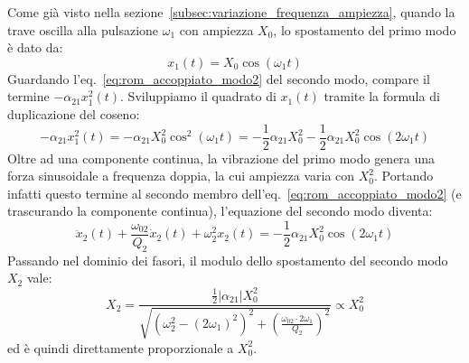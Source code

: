 \documentclass[11pt,a4paper]{article}
\begin{document}
\vspace{0.3cm}
\noindent Come già visto nella sezione~\ref{subsec:variazione_frequenza_ampiezza}, quando la trave oscilla alla pulsazione $\omega_1$ con ampiezza $X_0$, lo spostamento del primo modo è dato da:
\begin{equation}
    x_1(t) = X_0 \cos(\omega_1 t)
\end{equation}
Guardando l'eq.~\eqref{eq:rom_accoppiato_modo2} del secondo modo, compare il termine $-\alpha_{21} x_1^2(t)$. Sviluppiamo il quadrato di $x_1(t)$ tramite la formula di duplicazione del coseno:
\begin{equation}
    -\alpha_{21} x_1^2(t) = -\alpha_{21} X_0^2 \cos^2(\omega_1 t) = -\frac{1}{2} \alpha_{21} X_0^2 - \frac{1}{2} \alpha_{21} X_0^2 \cos(2\omega_1 t)
\end{equation}
Oltre ad una componente continua, la vibrazione del primo modo genera una forza sinusoidale a frequenza doppia, la cui ampiezza varia con $X_0^2$. Portando infatti questo termine al secondo membro dell'eq.~\eqref{eq:rom_accoppiato_modo2} (e trascurando la componente continua), l'equazione del secondo modo diventa:
\begin{equation}
    \ddot{x}_2(t) + \frac{\omega_{02}}{Q_2}\dot{x}_2(t) + \omega_2^2 x_2(t) = -\frac{1}{2} \alpha_{21} X_0^2 \cos(2\omega_1 t)
\end{equation}
Passando nel dominio dei fasori, il modulo dello spostamento del secondo modo $X_2$ vale:
\begin{equation}
    \label{eq:modulo_X2}
    X_2 = \frac{\frac{1}{2}|\alpha_{21}| X_0^2}{\sqrt{\left(\omega_2^2 - (2\omega_1)^2\right)^2 + \left(\frac{\omega_{02} \cdot 2\omega_1}{Q_2}\right)^2}} \propto X_0^2
\end{equation}
ed è quindi direttamente proporzionale a $X_0^2$.
\end{document}
